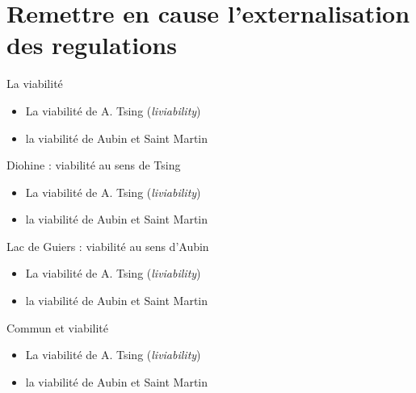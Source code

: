 \documentclass[newPxFont]{beamer}
\begin{document}

\section{Remettre en cause l'externalisation des regulations}

\begin{frame}[c]{La viabilité}
  \vspace{-1cm}
  \begin{itemize}
    \item La viabilité de A. Tsing (\textit{liviability})
    \item la viabilité de Aubin et Saint Martin
  \end{itemize}


\end{frame}

\begin{frame}[c]{Diohine : viabilité au sens de Tsing}
    \vspace{-1cm}
    \begin{itemize}
      \item La viabilité de A. Tsing (\textit{liviability})
      \item la viabilité de Aubin et Saint Martin
    \end{itemize}
  
  
\end{frame}

\begin{frame}[c]{Lac de Guiers : viabilité au sens  d'Aubin}
      \vspace{-1cm}
      \begin{itemize}
        \item La viabilité de A. Tsing (\textit{liviability})
        \item la viabilité de Aubin et Saint Martin
      \end{itemize}
    
    
\end{frame}

\begin{frame}[c]{Commun et viabilité}
  \vspace{-1cm}
  \begin{itemize}
    \item La viabilité de A. Tsing (\textit{liviability})
    \item la viabilité de Aubin et Saint Martin
  \end{itemize}


\end{frame}
\end{document}
